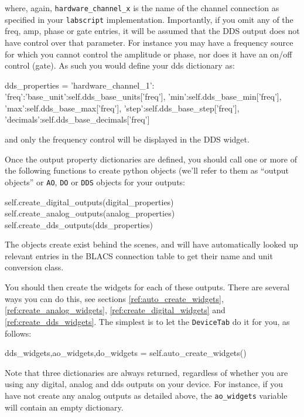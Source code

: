 \documentclass[12pt]{article}
\begin{document}
where, again, \texttt{hardware\_channel\_x} is the name of the channel connection as specified in your \texttt{labscript} implementation.
Importantly, if you omit any of the freq, amp, phase or gate entries, it will be assumed that the DDS output does not have control over that parameter. 
For instance you may have a frequency source for which you cannot control the amplitude or phase, nor does it have an on/off control (gate). 
As such you would define your dds dictionary as:
\begin{python}
    dds_properties = {'hardware_channel_1':
                           {'freq':{'base_unit':self.dds_base_units['freq'],
                                    'min':self.dds_base_min['freq'],
                                    'max':self.dds_base_max['freq'],
                                    'step':self.dds_base_step['freq'],
                                    'decimals':self.dds_base_decimals['freq']
                                   }
                            }
                      }
\end{python}
and only the frequency control will be displayed in the DDS widget.

Once the output property dictionaries are defined, you should call one or more of the following functions to create python objects (we'll refer to them as ``output objects'' or \texttt{AO}, \texttt{DO} or \texttt{DDS} objects for your outputs:
\begin{python}   
    self.create_digital_outputs(digital_properties)
    self.create_analog_outputs(analog_properties)
    self.create_dds_outputs(dds_properties)
\end{python}
The objects create exist behind the scenes, and will have automatically looked up relevant entries in the BLACS connection table to get their name and unit conversion class.

You should then create the widgets for each of these outputs. 
There are several ways you can do this, see sections \ref{ref:auto_create_widgets}, \ref{ref:create_analog_widgets}, \ref{ref:create_digital_widgets} and \ref{ref:create_dds_widgets}.
The simplest is to let the \texttt{DeviceTab} do it for you, as follows:
\begin{python}
    dds_widgets,ao_widgets,do_widgets = self.auto_create_widgets()
\end{python}
Note that three dictionaries are always returned, regardless of whether you are using any digital, analog and dds outputs on your device.
For instance, if you have not create any analog outputs as detailed above, the \texttt{ao\_widgets} variable will contain an empty dictionary.
\end{document}
